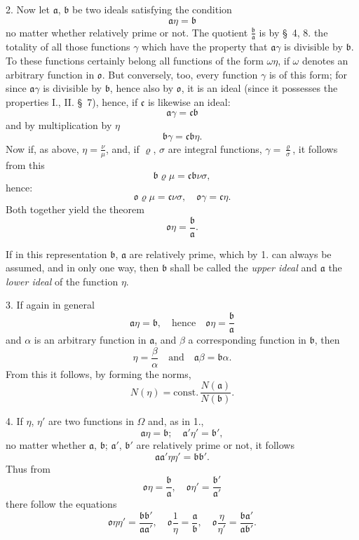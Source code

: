 \documentclass{article}
\begin{document}
2. Now let $\mathfrak{a}$, $\mathfrak{b}$ be two ideals satisfying the condition
\[ \mathfrak{a}\eta = \mathfrak{b} \]
no matter whether relatively prime or not. The quotient $\frac{\mathfrak{b}}{\mathfrak{a}}$ is by §~4, 8. the totality of all those functions $\gamma$ which have the property that $\mathfrak{a}\gamma$ is divisible by $\mathfrak{b}$. To these functions certainly belong all functions of the form $\omega\eta$, if $\omega$ denotes an arbitrary function in $\mathfrak{o}$. But conversely, too, every function $\gamma$ is of this form; for since $\mathfrak{a}\gamma$ is divisible by $\mathfrak{b}$, hence also by $\mathfrak{o}$, it is an ideal (since it possesses the properties I., II. §~7), hence, if $\mathfrak{c}$ is likewise an ideal:
\[ \mathfrak{a}\gamma = \mathfrak{c}\mathfrak{b} \]
and by multiplication by $\eta$
\[ \mathfrak{b}\gamma = \mathfrak{c}\mathfrak{b}\eta. \]
Now if, as above, $\eta = \frac{\nu}{\mu}$, and, if $\varrho$, $\sigma$ are integral functions, $\gamma = \frac{\varrho}{\sigma}$, it follows from this
\[ \mathfrak{b}\varrho\mu = \mathfrak{c}\mathfrak{b}\nu\sigma, \]
hence:
\[ \mathfrak{o}\varrho\mu = \mathfrak{c}\nu\sigma, \quad \mathfrak{o}\gamma = \mathfrak{c}\eta. \]
Both together yield the theorem
\[ \mathfrak{o}\eta = \frac{\mathfrak{b}}{\mathfrak{a}}. \tag{3.} \]

If in this representation $\mathfrak{b}$, $\mathfrak{a}$ are relatively prime, which by 1. can always be assumed, and in only one way, then $\mathfrak{b}$ shall be called the \emph{upper ideal} and $\mathfrak{a}$ the \emph{lower ideal} of the function $\eta$.

3. If again in general
\[ \mathfrak{a}\eta = \mathfrak{b}, \quad \text{hence} \quad \mathfrak{o}\eta = \frac{\mathfrak{b}}{\mathfrak{a}} \]
and $\alpha$ is an arbitrary function in $\mathfrak{a}$, and $\beta$ a corresponding function in $\mathfrak{b}$, then
\[ \eta = \frac{\beta}{\alpha} \quad \text{and} \quad \mathfrak{a}\beta = \mathfrak{b}\alpha. \]
From this it follows, by forming the norms,
\[ N(\eta) = \text{const.}\,\frac{N(\mathfrak{a})}{N(\mathfrak{b})}. \]

4. If $\eta$, $\eta'$ are two functions in $\Omega$ and, as in 1.,
\[ \mathfrak{a}\eta = \mathfrak{b}; \quad \mathfrak{a}'\eta' = \mathfrak{b}', \]
no matter whether $\mathfrak{a}$, $\mathfrak{b}$; $\mathfrak{a}'$, $\mathfrak{b}'$ are relatively prime or not, it follows
\[ \mathfrak{a}\mathfrak{a}'\eta\eta' = \mathfrak{b}\mathfrak{b}'. \]
Thus from
\[ \mathfrak{o}\eta = \frac{\mathfrak{b}}{\mathfrak{a}}, \quad \mathfrak{o}\eta' = \frac{\mathfrak{b}'}{\mathfrak{a}'} \]
there follow the equations
\[ \mathfrak{o}\eta\eta' = \frac{\mathfrak{b}\mathfrak{b}'}{\mathfrak{a}\mathfrak{a}'}, \quad \mathfrak{o}\frac{1}{\eta} = \frac{\mathfrak{a}}{\mathfrak{b}}, \quad \mathfrak{o}\frac{\eta}{\eta'} = \frac{\mathfrak{b}\mathfrak{a}'}{\mathfrak{a}\mathfrak{b}'}. \]
\end{document}
